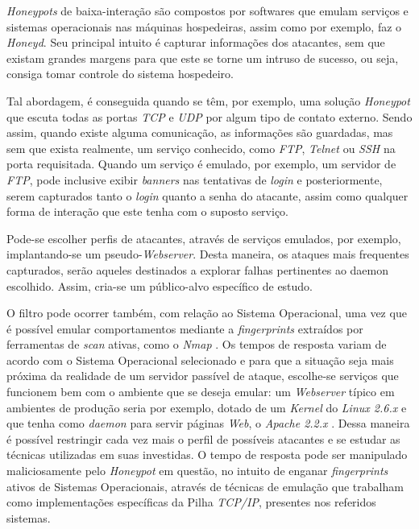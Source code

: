 \textit{Honeypots} de baixa-interação são compostos por softwares que emulam serviços e sistemas operacionais nas máquinas hospedeiras, assim como por exemplo, faz o \textit{Honeyd}. Seu principal intuito é capturar informações dos atacantes, sem que existam grandes margens para que este se torne um intruso de sucesso, ou seja, consiga tomar controle do sistema hospedeiro.

Tal abordagem, é conseguida quando se têm, por exemplo, uma solução \textit{Honeypot} que escuta todas as portas \textit{TCP} e \textit{UDP} por algum tipo de contato externo. Sendo assim, quando existe alguma comunicação, as informações são guardadas, mas sem que exista realmente, um serviço conhecido, como \textit{FTP}, \textit{Telnet} ou \textit{SSH} na porta requisitada. Quando um serviço é emulado, por exemplo, um servidor de \textit{FTP}, pode inclusive exibir \textit{banners} nas tentativas de \textit{login} e posteriormente, serem capturados tanto o \textit{login} quanto a senha do atacante, assim como qualquer forma de interação que este tenha com o suposto serviço.

Pode-se escolher perfis de atacantes, através de serviços emulados, por exemplo, implantando-se um pseudo-\textit{Webserver}. Desta maneira, os ataques mais frequentes capturados, serão aqueles destinados a explorar falhas pertinentes ao daemon escolhido. Assim, cria-se um público-alvo específico de estudo.

O filtro pode ocorrer também, com relação ao Sistema Operacional, uma vez que é possível emular comportamentos mediante a \textit{fingerprints} extraídos por ferramentas de \textit{scan} ativas, como o \textit{Nmap} \cite{Nmap}. Os tempos de resposta variam de acordo com o Sistema Operacional selecionado e para que a situação seja mais próxima da realidade de um servidor passível de ataque, escolhe-se serviços que funcionem bem com o ambiente que se deseja emular: um \textit{Webserver} típico em ambientes de produção seria por exemplo, dotado de um \textit{Kernel} do \textit{Linux 2.6.x} e que tenha como \textit{daemon} para servir páginas \textit{Web}, o \textit{Apache 2.2.x} \cite{Apache2}. Dessa maneira é possível restringir cada vez mais o perfil de possíveis atacantes e se estudar as técnicas utilizadas em suas investidas. O tempo de resposta pode ser manipulado maliciosamente pelo \textit{Honeypot} em questão, no intuito de enganar \textit{fingerprints} ativos de Sistemas Operacionais, através de técnicas de emulação que trabalham como implementações específicas da Pilha \textit{TCP/IP}, presentes nos referidos sistemas.

